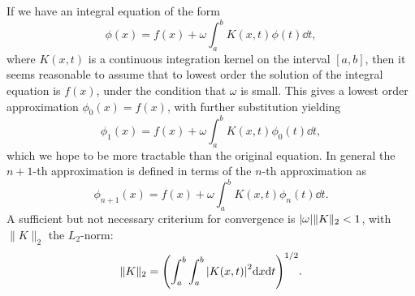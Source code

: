 \documentclass[11pt, a4paper]{report} %
\begin{document}
If we have an integral equation of the form
\begin{equation}
  \phi(x) = f(x) + \omega \int_{a}^b K(x,t)\phi(t) \dd t,
\end{equation}
where $K(x,t)$ is a continuous integration kernel on the interval $[a,b]$, then it seems reasonable to assume that to lowest order the solution of the integral equation is $f(x)$, under the condition that $\omega$ is small.
This gives a lowest order approximation $\phi_0(x) = f(x)$, with further substitution yielding 
\begin{equation}
  \phi_1(x) = f(x) + \omega \int_{a}^b K(x,t)\phi_0(t) \dd t,
\end{equation}
which we hope to be more tractable than the original equation.
In general the $n+1$-th approximation is defined in terms of the $n$-th approximation as
\begin{equation}
  \phi_{n+1}(x) = f(x) + \omega \int_{a}^b K(x,t)\phi_n(t) \dd t.
\end{equation}
A sufficient but not necessary criterium for convergence is $\abs{\omega} \lVert K \rVert_2 < 1$, with $\lVert K \rVert_2$ the $L_2$-norm:
\begin{equation}
  \lVert K \rVert_2 = {\qty( \int_{a}^b \int_a^b \abs{K(x,t)}^2 \dd x \dd t)}^{1/2}.
\end{equation}
\end{document}
